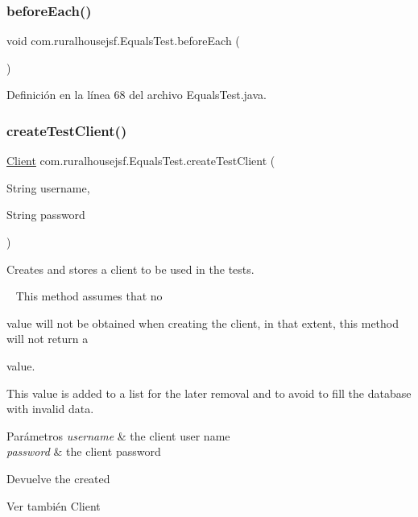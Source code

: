 \subsubsection{\texorpdfstring{beforeEach()}{beforeEach()}}
{\footnotesize\ttfamily void com.\+ruralhousejsf.\+Equals\+Test.\+before\+Each (\begin{DoxyParamCaption}{ }\end{DoxyParamCaption})\hspace{0.3cm}{\ttfamily [package]}}



Definición en la línea 68 del archivo Equals\+Test.\+java.

\mbox{\label{a00248_a08081415d14d86f7b8a63fe7270546dc}} 
\subsubsection{\texorpdfstring{createTestClient()}{createTestClient()}}
{\footnotesize\ttfamily \mbox{\hyperlink{a00164}{Client}} com.\+ruralhousejsf.\+Equals\+Test.\+create\+Test\+Client (\begin{DoxyParamCaption}\item[{String}]{username,  }\item[{String}]{password }\end{DoxyParamCaption})\hspace{0.3cm}{\ttfamily [private]}}



Creates and stores a client to be used in the tests. 

~\newline
 This method assumes that no
\begin{DoxyCode}{0}
\DoxyCodeLine{\textcolor{keyword}{null} }
\end{DoxyCode}
 value will not be obtained when creating the client, in that extent, this method will not return a 
\begin{DoxyCode}{0}
\DoxyCodeLine{\textcolor{keyword}{null} }
\end{DoxyCode}
 value. 

This value is added to a list for the later removal and to avoid to fill the database with invalid data.


\begin{DoxyParams}{Parámetros}
{\em username} & the client user name \\
\hline
{\em password} & the client password\\
\hline
\end{DoxyParams}
\begin{DoxyReturn}{Devuelve}
the created
\begin{DoxyCode}{0}
\end{DoxyCode}

\end{DoxyReturn}
\begin{DoxySeeAlso}{Ver también}
Client 
\end{DoxySeeAlso}



